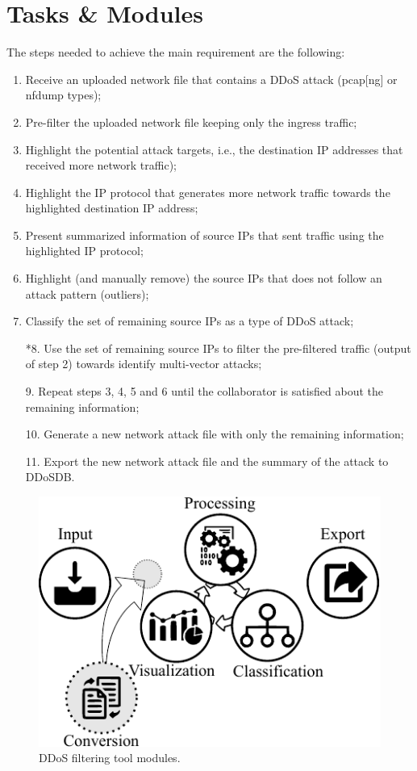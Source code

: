 \documentclass{llncs}
\begin{document}
\section{Tasks \& Modules}

The steps needed to achieve the main requirement are the following:
\begin{enumerate}
	\item Receive an uploaded network file that contains a DDoS attack (pcap[ng] or nfdump types);	
	\item Pre-filter the uploaded network file keeping only the ingress traffic;
	\item Highlight the potential attack targets, i.e., the destination IP addresses that received more network traffic);
	\item Highlight the IP protocol that generates more network traffic towards the highlighted destination IP address;
	\item Present summarized information of source IPs that sent traffic using the highlighted IP protocol;
	\item Highlight (and manually remove) the source IPs that does not follow an attack pattern (outliers);
	\item Classify the set of remaining source IPs as a type of DDoS attack;
	\item[*8.] Use the set of remaining source IPs to filter the pre-filtered traffic (output of step 2) towards identify multi-vector attacks;  
	\item[9.] Repeat steps 3, 4, 5 and 6 until the collaborator is satisfied about the remaining information;
	\item[10.] Generate a new network attack file with only the remaining information;
	\item[11.] Export the new network attack file and the summary of the attack to DDoSDB.
\end{enumerate}

\begin{figure}[!ht] 
\centering 
\includegraphics[]{figs/modules.pdf}
\caption{DDoS filtering tool modules.} 
\label{fig:modules} 
\end{figure}
\end{document}
